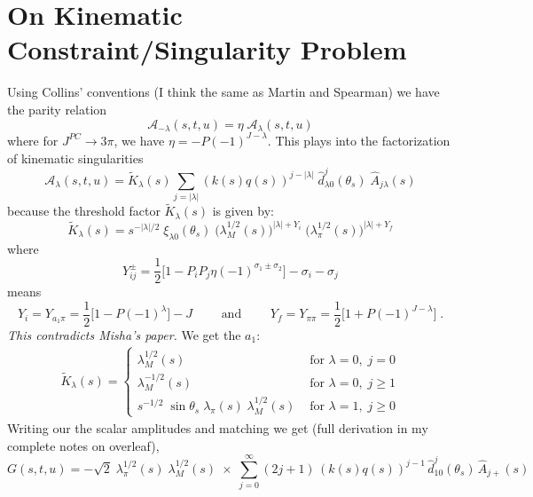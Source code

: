 \documentclass[10pt, aps,prd,amsmath,amssymb,superscriptaddress,onecolumn,
nofootinbib,showpacs,preprintnumbers]{revtex4-1}
\newcommand{\mand}{\qquad \text{ and } \qquad}
\begin{document}
\section{On Kinematic Constraint/Singularity Problem}
Using Collins' conventions (I think the same as Martin and Spearman) we have the parity relation
  \begin{equation}
    \mathcal{A}_{-\lambda}(s,t,u) = \eta \; \mathcal{A}_{\lambda}(s,t,u)
  \end{equation}
where for \(J^{PC} \to 3 \pi\), we have \(\eta = - P(-1)^{J - \lambda}\). This plays into the factorization of kinematic singularities
  \begin{equation}
    \mathcal{A}_{\lambda}(s,t,u) = \tilde{K}_\lambda(s) \sum_{j = |\lambda|} (k(s)q(s))^{j-|\lambda|} \; \hat{d}_{\lambda0}^j(\theta_s) \; \hat{A}_{j\lambda}(s)
  \end{equation}
because the threshold factor \(\tilde{K}_\lambda(s)\) is given by:
  \begin{equation}
    \tilde{K}_\lambda(s) = s^{-|\lambda|/2} \; \xi_{\lambda0}(\theta_s) \;
      \big(\lambda^{1/2}_M(s)\big)^{|\lambda| + Y_i} \; \big(\lambda_\pi^{1/2}(s)\big)^{|\lambda| + Y_f}
  \end{equation}
where
  \begin{equation}
    Y_{ij}^{\pm} = \frac{1}{2} \big[
    1 - P_{i}P_{j}\eta(-1)^{\sigma_1 \pm \sigma_2} \big] -\sigma_i - \sigma_j
  \end{equation}
  means
  \begin{equation}
      Y_i = Y_{a_1 \pi} = \frac{1}{2}\big[1- P(-1)^{\lambda}\big] - J \mand Y_f = Y_{\pi\pi} = \frac{1}{2} \big[ 1 + P (-1)^{J-\lambda}] \; .
  \end{equation}
\textit{This contradicts Misha's paper.} We get the \(a_1\):
  \begin{align}
    \tilde{K}_{\lambda}(s) =
    \begin{cases}
       \lambda^{1/2}_M(s)    &     \text{  for }\lambda = 0, \; j=0 \\
       \lambda^{-1/2}_M(s)  &\text{ for } \lambda = 0, \; j\geq 1 \\
       s^{-1/2} \; \sin\theta_s \; \lambda_\pi(s) \; \lambda_M^{1/2}(s)    &\text{ for } \lambda = 1, \; j\geq 0
    \end{cases}
  \end{align}
Writing our the scalar amplitudes and matching we get (full derivation in my complete notes on overleaf),
\begin{equation}
  G(s,t,u) =  - \sqrt{2} \; \lambda^{1/2}_\pi(s) \; \lambda^{1/2}_M(s) \;  \times \; \sum_{j = 0}^\infty (2j+1) \, (k(s)q(s))^{j - 1} \,\hat{d}^j_{10}(\theta_s) \, \hat{A}_{j+}(s)
\end{equation}
\end{document}
